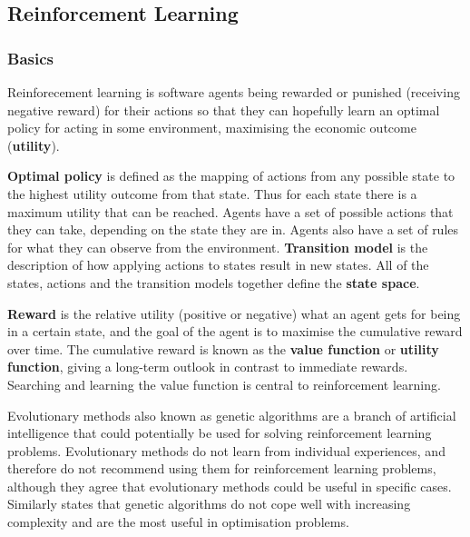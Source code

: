\subsection{Reinforcement Learning}
\label{sec:ai}

\subsubsection{Basics}

Reinforecement learning is software agents being rewarded or punished
(receiving negative reward) for their actions so that they can hopefully learn
an optimal policy for acting in some environment, maximising the economic
outcome (\textbf{utility}).

\textbf{Optimal policy} is defined as the mapping of actions from any possible
state to the highest utility outcome from that state. Thus for each state there
is a maximum utility that can be reached. Agents have a set of possible actions
that they can take, depending on the state they are in. Agents also have a set
of rules for what they can observe from the environment. \textbf{Transition
model} is the description of how applying actions to states result in new
states. All of the states, actions and the transition models together define
the \textbf{state space}. \parencite{Russell2010ai+modern,
Sutton1998ai+reinforcement}

\textbf{Reward} is the relative utility (positive or negative) what an agent
gets for being in a certain state, and the goal of the agent is to maximise the
cumulative reward over time. The cumulative reward is known as the
\textbf{value function} or \textbf{utility function}, giving a long-term
outlook in contrast to immediate rewards. Searching and learning the value
function is central to reinforcement learning. \parencite{Russell2010ai+modern,
Sutton1998ai+reinforcement}

Evolutionary methods \parencite{Sutton1998ai+reinforcement} also known as
genetic algorithms \parencite{Russell2010ai+modern} are a branch of artificial
intelligence that could potentially be used for solving reinforcement learning
problems. Evolutionary methods do not learn from individual experiences, and
therefore \textcite{Sutton1998ai+reinforcement} do not recommend using them for
reinforcement learning problems, although they agree that evolutionary methods
could be useful in specific cases. Similarly \textcite{Russell2010ai+modern}
states that genetic algorithms do not cope well with increasing complexity and
are the most useful in optimisation problems.


